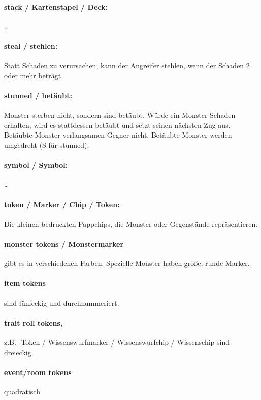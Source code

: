 \paragraph{stack / Kartenstapel / Deck:} …

\paragraph{steal / stehlen:} Statt Schaden zu verursachen, kann der Angreifer stehlen, wenn der Schaden 2 oder mehr beträgt.

\paragraph{stunned / betäubt:} Monster sterben nicht, sondern sind betäubt. Würde ein Monster Schaden erhalten, wird es stattdessen betäubt und setzt seinen nächsten Zug aus. Betäubte Monster verlangsamen Gegner nicht. Betäubte Monster werden umgedreht (S für stunned).

\paragraph{symbol / Symbol:} …

\paragraph{token / Marker / Chip / Token:} Die kleinen bedruckten Pappchips, die Monster oder Gegenstände repräsentieren.

\paragraph{monster tokens / Monstermarker} gibt es in verschiedenen Farben. Spezielle Monster haben große, runde Marker.

\paragraph{item tokens} sind fünfeckig und durchnummeriert.

\paragraph{trait roll tokens,} z.B. \knowroll-Token / Wissenswurfmarker / Wissenswurfchip / Wissenschip sind dreieckig.

\paragraph{event/room tokens} quadratisch

